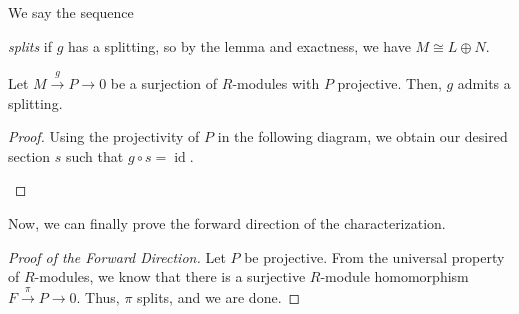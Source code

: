 \documentclass[10pt]{mypackage}
\begin{document}
\begin{definition}
  We say the sequence
  \begin{center}
  \end{center}
  \textit{splits} if $g$ has a splitting, so by the lemma and exactness, we have $M \cong L\oplus N$.
\end{definition}
\begin{lemma}
  Let $M\xrightarrow{g}P\rightarrow 0$ be a surjection of $R$-modules with $P$ projective. Then, $g$ admits a splitting.
\end{lemma}
\begin{proof}
  Using the projectivity of $P$ in the following diagram, we obtain our desired section $s$ such that $g\circ s = \operatorname{id}$.
  \begin{center}
  \end{center}
\end{proof}
Now, we can finally prove the forward direction of the characterization.
\begin{proof}[Proof of the Forward Direction]
  Let $P$ be projective. From the universal property of $R$-modules, we know that there is a surjective $R$-module homomorphism $F\xrightarrow{\pi}P\rightarrow 0$. Thus, $\pi$ splits, and we are done.
\end{proof}
\end{document}
